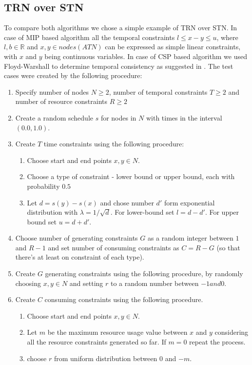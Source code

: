 \documentclass{article}
\begin{document}
\begin{multicols}{2}
\subsection{TRN over STN}
To compare both algorithms we chose a simple example of TRN over STN. In case of MIP based algorithm all the temporal constraints $l \leq x - y \leq u$, where $l,b \in \mathbb{R}$ and $x,y \in nodes(ATN)$ can be expressed as simple linear constraints, with $x$ and $y$ being continuous variables. In case of CSP based algorithm we used Floyd-Warshall to determine temporal consistency as suggested in \cite{dechter1991temporal}. The test cases were created by the following procedure:
\begin{enumerate}
\item Specify number of nodes $N \geq 2$, number of temporal constraints $T\geq 2$ and number of resource constraints $R\geq 2$
\item Create a random schedule $s$ for nodes in $N$ with times in the interval $(0.0, 1.0)$.
\item Create $T$ time constraints using the following procedure:
  \begin{enumerate}
  \item Choose start and end points $x,y \in N$.
  \item Choose a type of constraint - lower bound or upper bound, each with probability $0.5$
  \item Let $d=s(y) - s(x)$ and chose number $d'$ form exponential distribution with $\lambda = 1 / \sqrt{d}$. For lower-bound set $l = d - d'$. For upper bound set $u = d + d'$.
  \end{enumerate}
\item Choose number of generating constraints $G$ as a random integer between $1$ and $R-1$ and set number of consuming constraints as $C = R - G$ (so that there's at least on constraint of each type).
\item Create $G$ generating constraints using the following procedure, by randomly choosing $x,y \in N$ and setting $r$ to a random number between $-1 and 0$.
\item Create $C$ consuming constraints using the following procedure.
  \begin{enumerate}
  \item Choose start and end points $x,y \in N$.
  \item Let $m$ be the maximum resource usage value between $x$ and $y$ considering all the resource constraints generated so far. If $m = 0$ repeat the process.
  \item choose $r$ from uniform distribution between $0$ and $-m$.
  \end{enumerate}
\end{enumerate}


\end{multicols}
\end{document}
